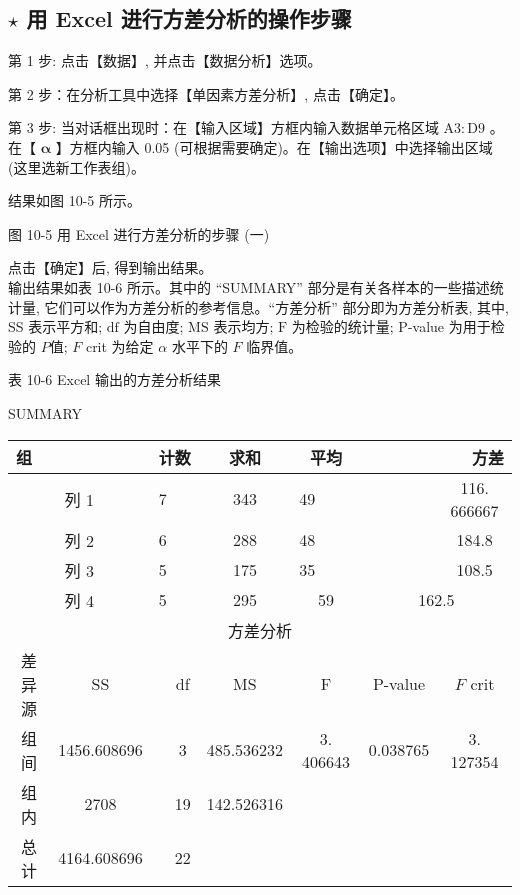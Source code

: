 \documentclass[10pt]{article}
\begin{document}
\begin{CJK*}{UTF8}{bsmi}
\section*{$\star$ 用 Excel 进行方差分析的操作步骤}
第 1 步: 点击【数据】, 并点击【数据分析】选项。

第 2 步：在分析工具中选择【单因素方差分析】, 点击【确定】。

第 3 步: 当对话框出现时：在【输入区域】方框内输入数据单元格区域 $\mathrm{A} 3: \mathrm{D} 9$ 。在【 $\boldsymbol{\alpha}$ 】方框内输入 0.05 (可根据需要确定)。在【输出选项】中选择输出区域 (这里选新工作表组)。

结果如图 10-5 所示。

\begin{center}
\end{center}

图 10-5 用 Excel 进行方差分析的步骤 (一)

点击【确定】后, 得到输出结果。\\
输出结果如表 10-6 所示。其中的 “SUMMARY” 部分是有关各样本的一些描述统计量, 它们可以作为方差分析的参考信息。“方差分析” 部分即为方差分析表, 其中, SS 表示平方和; $\mathrm{df}$ 为自由度; $\mathrm{MS}$ 表示均方; $\mathrm{F}$ 为检验的统计量; $\mathrm{P}$-value 为用于检验的 $P$值; $F$ crit 为给定 $\alpha$ 水平下的 $F$ 临界值。

表 10-6 Excel 输出的方差分析结果

SUMMARY

\begin{center}
\begin{tabular}{|c|c|c|c|c|c|c|c|}
\hline
\multicolumn{2}{|l|}{组} & \multicolumn{2}{|l|}{计数} & 求和 & 平均 & \multicolumn{2}{|r|}{方差} \\
\hline
\multicolumn{2}{|c|}{列 1} & \multicolumn{2}{|l|}{7} & 343 & \multicolumn{2}{|l|}{49} & 116. 666667 \\
\hline
\multicolumn{2}{|c|}{列 2} & \multicolumn{2}{|l|}{6} & 288 & \multicolumn{2}{|l|}{48} & 184.8 \\
\hline
\multicolumn{2}{|c|}{列 3} & \multicolumn{2}{|l|}{5} & 175 & \multicolumn{2}{|l|}{35} & 108.5 \\
\hline
\multicolumn{2}{|c|}{列 4} & \multicolumn{2}{|l|}{5} & 295 & 59 & \multicolumn{2}{|c|}{162.5} \\
\hline
\multicolumn{8}{|c|}{方差分析} \\
\hline
差异源 & SS &  & df & MS & F & P-value & $F$ crit \\
\hline
组间 & 1456.608696 &  & 3 & 485.536232 & 3. 406643 & 0.038765 & 3. 127354 \\
\hline
组内 & 2708 &  & 19 & 142.526316 &  &  &  \\
\hline
总计 & 4164.608696 &  & 22 &  &  &  &  \\
\hline
\end{tabular}
\end{center}


\end{CJK*}
\end{document}
